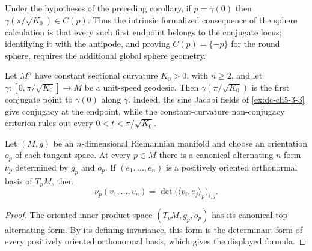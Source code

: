 %
%

\begin{corollary}
  \label{cor:dc-ch5-3-3-conjugate-locus-endpoint}


  Under the hypotheses of the preceding corollary, if $p=\gamma(0)$ then
  $\gamma(\pi/\sqrt{K_0})\in C(p)$. Thus the intrinsic formalized consequence
  of the sphere calculation is that every such first endpoint belongs to the
  conjugate locus; identifying it with the antipode, and proving
  $C(p)=\{-p\}$ for the round sphere, requires the additional global sphere
  geometry.
\end{corollary}

\begin{corollary}
  \label{cor:dc-ch5-3-3-first-conjugate}


  Let $M^n$ have constant sectional curvature $K_0>0$, with $n\geq 2$, and let
  $\gamma\colon[0,\pi/\sqrt{K_0}]\to M$ be a unit-speed geodesic. Then
  $\gamma(\pi/\sqrt{K_0})$ is the first conjugate point to $\gamma(0)$ along
  $\gamma$. Indeed, the sine Jacobi fields of \cref{ex:dc-ch5-3-3} give
  conjugacy at the endpoint, while the constant-curvature non-conjugacy
  criterion rules out every $0<t<\pi/\sqrt{K_0}$.
\end{corollary}

\begin{lemma}
  \label{lem:dc-ch1-2-11-pointwise}


  Let $(M,g)$ be an $n$-dimensional Riemannian manifold and choose an orientation
  $o_p$ of each tangent space.  At every $p\in M$ there is a canonical alternating
  $n$-form $\nu_p$ determined by $g_p$ and $o_p$.  If $(e_1,\ldots,e_n)$ is a
  positively oriented orthonormal basis of $T_pM$, then
  $$
  \nu_p(v_1,\ldots,v_n)=\det\bigl(\langle v_i,e_j\rangle_p\bigr)_{i,j}.
  $$
\end{lemma}
\begin{proof}

  The oriented inner-product space $(T_pM,g_p,o_p)$ has its canonical top
  alternating form.  By its defining invariance, this form is the determinant
  form of every positively oriented orthonormal basis, which gives the displayed
  formula.
\end{proof}

